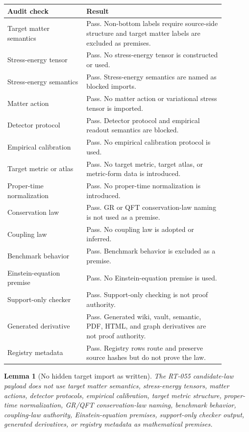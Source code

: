\documentclass[11pt]{article}
\newtheorem{lemma}{Lemma}
\begin{document}
\begin{longtable}{p{0.32\linewidth}p{0.56\linewidth}}
\toprule
Audit check & Result \\
\midrule
Target matter semantics & Pass.  Non-bottom labels require source-side structure and target matter labels are excluded as premises. \\
Stress-energy tensor & Pass.  No stress-energy tensor is constructed or used. \\
Stress-energy semantics & Pass.  Stress-energy semantics are named as blocked imports. \\
Matter action & Pass.  No matter action or variational stress tensor is imported. \\
Detector protocol & Pass.  Detector protocol and empirical readout semantics are blocked. \\
Empirical calibration & Pass.  No empirical calibration protocol is used. \\
Target metric or atlas & Pass.  No target metric, target atlas, or metric-form data is introduced. \\
Proper-time normalization & Pass.  No proper-time normalization is introduced. \\
Conservation law & Pass.  GR or QFT conservation-law naming is not used as a premise. \\
Coupling law & Pass.  No coupling law is adopted or inferred. \\
Benchmark behavior & Pass.  Benchmark behavior is excluded as a premise. \\
Einstein-equation premise & Pass.  No Einstein-equation premise is used. \\
Support-only checker & Pass.  Support-only checking is not proof authority. \\
Generated derivative & Pass.  Generated wiki, vault, semantic, PDF, HTML, and graph derivatives are not proof authority. \\
Registry metadata & Pass.  Registry rows route and preserve source hashes but do not prove the law. \\
\bottomrule
\end{longtable}

\begin{lemma}[No hidden target import as written]
The RT-055 candidate-law payload does not use target matter semantics,
stress-energy tensors, matter actions, detector protocols, empirical
calibration, target metric structure, proper-time normalization, GR/QFT
conservation-law naming, benchmark behavior, coupling-law authority,
Einstein-equation premises, support-only checker output, generated
derivatives, or registry metadata as mathematical premises.
\end{lemma}
\end{document}
